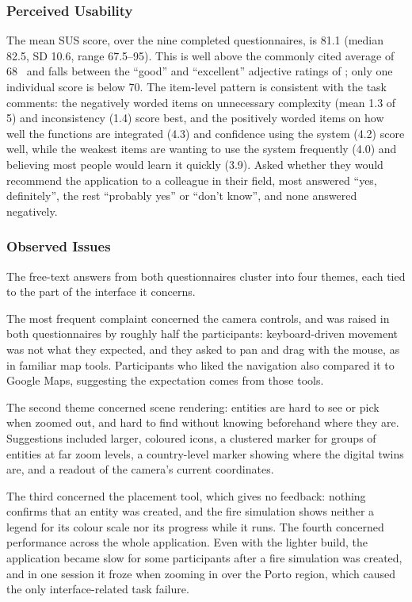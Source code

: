 \subsubsection*{Perceived Usability}

The mean SUS score, over the nine completed questionnaires, is 81.1 (median 82.5, SD 10.6, range 67.5--95). This is well above the commonly cited average of 68~\cite{sauro2011sus} and falls between the ``good'' and ``excellent'' adjective ratings of \textcite{bangor2009sus}; only one individual score is below 70. The item-level pattern is consistent with the task comments: the negatively worded items on unnecessary complexity (mean 1.3 of 5) and inconsistency (1.4) score best, and the positively worded items on how well the functions are integrated (4.3) and confidence using the system (4.2) score well, while the weakest items are wanting to use the system frequently (4.0) and believing most people would learn it quickly (3.9). Asked whether they would recommend the application to a colleague in their field, most answered ``yes, definitely'', the rest ``probably yes'' or ``don't know'', and none answered negatively.

\subsubsection*{Observed Issues}

The free-text answers from both questionnaires cluster into four themes, each tied to the part of the interface it concerns.

The most frequent complaint concerned the camera controls, and was raised in both questionnaires by roughly half the participants: keyboard-driven movement was not what they expected, and they asked to pan and drag with the mouse, as in familiar map tools. Participants who liked the navigation also compared it to Google Maps, suggesting the expectation comes from those tools.

The second theme concerned scene rendering: entities are hard to see or pick when zoomed out, and hard to find without knowing beforehand where they are. Suggestions included larger, coloured icons, a clustered marker for groups of entities at far zoom levels, a country-level marker showing where the digital twins are, and a readout of the camera's current coordinates.

The third concerned the placement tool, which gives no feedback: nothing confirms that an entity was created, and the fire simulation shows neither a legend for its colour scale nor its progress while it runs. The fourth concerned performance across the whole application. Even with the lighter build, the application became slow for some participants after a fire simulation was created, and in one session it froze when zooming in over the Porto region, which caused the only interface-related task failure.

